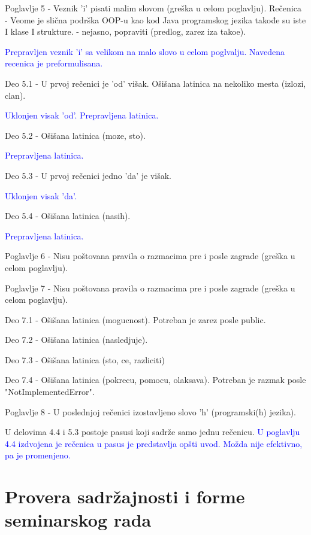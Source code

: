 \documentclass[a4paper]{report}
\newcommand{\odgovor}[1]{\textcolor{blue}{#1}}
\begin{document}
Poglavlje 5 - Veznik 'i' pisati malim slovom (gre\v ska u celom poglavlju).
Re\v cenica - Veome je sli\v cna podr\v ska OOP-u kao kod Java programskog jezika takođe su iste I klase I strukture. - nejasno, popraviti (predlog, zarez iza tako\dj{}e).

\odgovor{
Prepravljen veznik 'i' sa velikom na malo slovo u celom poglvalju. Navedena recenica je preformulisana.
}

Deo 5.1 - U prvoj re\v cenici je 'od' vi\v sak. O\v si\v sana latinica na nekoliko mesta (izlozi, clan).

\odgovor{
Uklonjen visak 'od'. Prepravljena latinica.
}

Deo 5.2 - O\v si\v sana latinica (moze, sto).

\odgovor{
Prepravljena latinica.
}

Deo 5.3 - U prvoj re\v cenici jedno 'da' je vi\v sak.

\odgovor{
Uklonjen visak 'da'.
}

Deo 5.4 - O\v si\v sana latinica (nasih).

\odgovor{
Prepravljena latinica.
}

Poglavlje 6 - Nisu po\v stovana pravila o razmacima pre i posle zagrade (gre\v ska u celom poglavlju).

Poglavlje 7 - Nisu po\v stovana pravila o razmacima pre i posle zagrade (gre\v ska u celom poglavlju).

Deo 7.1 - O\v si\v sana latinica (mogucnost). Potreban je zarez posle public.

Deo 7.2 - O\v si\v sana latinica (nasledjuje).

Deo 7.3 - O\v si\v sana latinica (sto, ce, razliciti)

Deo 7.4 - O\v si\v sana latinica (pokrecu, pomocu, olaksava). Potreban je razmak posle "NotImplementedError".

Poglavlje 8 - U poslednjoj re\v cenici izostavljeno slovo 'h' (programski(h) jezika).

U delovima 4.4 i 5.3 postoje pasusi koji sadr\v ze samo jednu re\v cenicu.
\odgovor{
U poglavlju 4.4 izdvojena je rečenica u pasus je predstavlja opšti uvod. Možda nije efektivno, pa je promenjeno. 
}

\section{Provera sadržajnosti i forme seminarskog rada}
\end{document}
